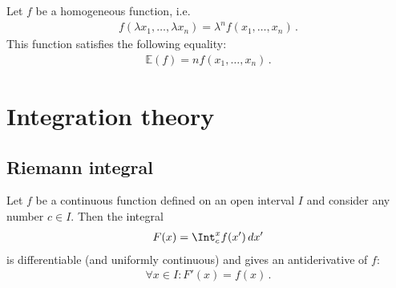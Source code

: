     \begin{theorem}[Euler]\label{calculus:euler_homogeneous_functions}
        Let $f$ be a homogeneous function, i.e.
        \begin{gather}
            f(\lambda x_1,\ldots,\lambda x_n) = \lambda^nf(x_1,\ldots,x_n)\,.
        \end{gather}
        This function satisfies the following equality:
        \begin{gather}
            \mathbb{E}(f) = nf(x_1,\ldots,x_n)\,.
        \end{gather}
    \end{theorem}

\section{Integration theory}
\subsection{Riemann integral}


    \begin{theorem}\label{calculus:first_fundamental_theorem}
        Let $f$ be a continuous function defined on an open interval $I$ and consider any number $c\in I$. Then the integral
        \begin{gather}
            F(x) = \Int_c^xf(x')\,dx'
        \end{gather}
        is differentiable (and uniformly continuous) and gives an antiderivative of $f$:
        \begin{gather}
            \forall x\in I:F'(x)=f(x)\,.
        \end{gather}
    \end{theorem}

